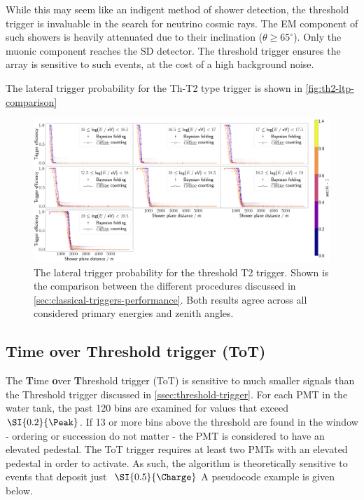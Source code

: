 While this may seem like an indigent method of shower detection, the threshold trigger is invaluable in the search for neutrino cosmic rays. The EM component of 
such showers is heavily attenuated due to their inclination ($\theta \geq 65^\circ$). Only the muonic component reaches the SD detector. The threshold trigger 
ensures the array is sensitive to such events, at the cost of a high background noise. 

The lateral trigger probability for the Th-T2 type trigger is shown in \autoref{fig:th2-ltp-comparison}

\begin{figure}
	\centering
	\includegraphics[width=\textwidth]{./plots/th2_LTP_comparison.png}
	\caption{The lateral trigger probability for the threshold T2 trigger. Shown is the comparison between the different procedures discussed in 
	\autoref{sec:classical-triggers-performance}. Both results agree across all considered primary energies and zenith angles.} 
	\label{fig:th2-ltp-comparison}
\end{figure}

\subsection{Time over Threshold trigger (ToT)}
\label{ssec:time-over-threshold-trigger}

The \textbf{T}ime \textbf{o}ver \textbf{T}hreshold trigger (ToT) is sensitive to much smaller signals than the Threshold trigger discussed in 
\autoref{ssec:threshold-trigger}. For each PMT in the water tank, the past 120 bins are examined for values that exceed $\SI{0.2}{\Peak}$. If 13 or more bins
above the threshold are found in the window - ordering or succession do not matter - the PMT is considered to have an elevated pedestal. The ToT trigger requires
at least two PMTs with an elevated pedestal in order to activate. As such, the algorithm is theoretically sensitive to events that deposit just $~\SI{0.5}{\Charge}$ 
A pseudocode example is given below.


